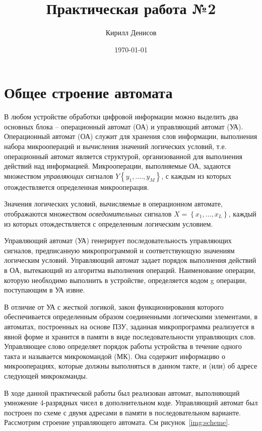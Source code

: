 \documentclass[a4paper,14pt]{extarticle}
\author{Кирилл Денисов}
\title{Практическая работа №2}
\date{\today}
\newcommand{\pathToCommonFolder}{/home/denilai/Desktop/LaTeX/Common}
\begin{document}
	\thispagestyle{empty}
	
	
	
	\newpage
	\tableofcontents
	\newpage
	
\section{Общее строение автомата}
В любом устройстве обработки цифровой информации можно выделить два основных блока – операционный автомат (ОА) и управляющий автомат (УА). Операционный автомат (ОА) служит для хранения слов информации, выполнения набора микроопераций и вычисления значений логических условий, т.е. операционный автомат является структурой, организованной для выполнения действий над информацией. Микрооперации, выполняемые ОА, задаются множеством \textit{управляющих} сигналов $Y\left\{y_1,....,y_M\right\}$, с каждым из которых отождествляется определенная микрооперация.

Значения логических условий, вычисляемые в операционном автомате, отображаются множеством \textit{осведомительных} сигналов $X=\left\{x_1,...,x_L\right\}$, каждый из которых отождествляется с определенным логическим условием.

Управляющий автомат (УА) генерирует последовательность управляющих сигналов, предписанную микропрограммой и соответствующую значениям логическим условий. Управляющий автомат задает порядок выполнения действий в ОА, вытекающий из алгоритма выполнения операций. Наименование операции, которую необходимо выполнить в устройстве, определяется кодом g операции, поступающим в УА извне. 

В отличие от УА с жесткой логикой, закон функционирования которого обеспечивается определенным образом соединенными логическими элементами, в автоматах, построенных на основе ПЗУ, заданная микропрограмма реализуется в явной форме и хранится в памяти в виде последовательности управляющих слов. Управляющее слово определяет порядок работы устройства в течение одного такта и называется микрокомандой (МК). Она содержит информацию о микрооперациях, которые должны выполняться в данном такте, и (или) об адресе следующей микрокоманды.




В ходе данной практической работы был реализован автомат, выполняющий умножение 4-разрядных чисел в дополнительном коде. Управляющий автомат был построен по схеме с двумя адресами в памяти в последовательном варианте. Рассмотрим строение управляющего автомата. См рисунок~\ref{img:scheme}.
\end{document}
